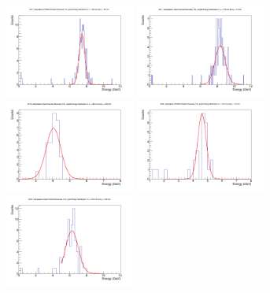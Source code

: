 \documentclass[hidelinks,11pt]{article}
\numberwithin{figure}{section}
\numberwithin{table}{section}
\begin{document}
\begin{figure}[hbtp]
\begin{center}
\includegraphics[width=0.38\textwidth]{Plots/Spectra/Plot_2017_Interpolation-sPHENIX-Rotation-Reversed_Fits_recalib_184-181.png}
\includegraphics[width=0.38\textwidth]{Plots/Spectra/Plot_2017_Interpolation-Dual-Channel-Reversed_Fits_recalib_178-74.png}
\includegraphics[width=0.38\textwidth]{Plots/Spectra/Plot_2018_Interpolation-Dual-Channel-Reversed_Fits_recalib_405-256.png}
\includegraphics[width=0.38\textwidth]{Plots/Spectra/Plot_2018_Interpolation-sPHENIX-Rotation-Reversed_Fits_recalib_401-119.png}
\includegraphics[width=0.38\textwidth]{Plots/Spectra/Plot_2018_Interpolation-Dual-Channel-Reversed_Fits_prod_518-150.png}

\end{center}
\end{figure}
\end{document}
